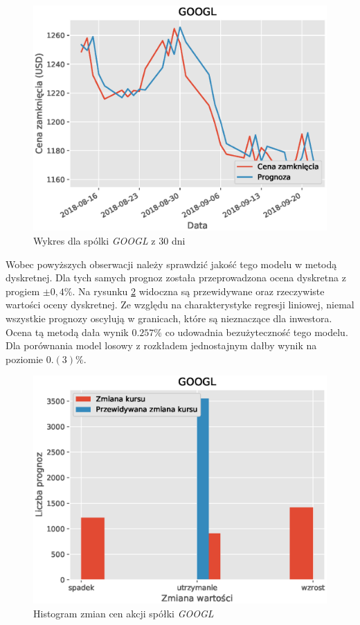 \documentclass[a4paper, twoside, 11pt, openright]{article}
\begin{document}
\begin{figure}[H]
\centering \includegraphics[scale=0.9]{img/linear_regression/l_r_1_day_last_30}
\caption{Wykres dla spólki \textit{GOOGL} z 30 dni}
\label{l_r_1_day_last_30}
\end{figure}


\bigskip

Wobec powyższych obserwacji należy sprawdzić jakość tego modelu w metodą dyskretnej. Dla tych samych prognoz została przeprowadzona ocena dyskretna z progiem $\pm0,4\%$. Na rysunku \ref{l_r_discrete_score} widoczna są przewidywane oraz rzeczywiste wartości oceny dyskretnej. Ze względu na charakterystyke regresji liniowej, niemal wszystkie prognozy oscylują w granicach, które są nieznaczące dla inwestora. Ocena tą metodą dała wynik $0.257\%$ co udowadnia bezużyteczność tego modelu. Dla porównania model losowy z rozkładem jednostajnym dałby wynik na poziomie $0.(3)\%$.


\begin{figure}[H]
\centering \includegraphics[scale=0.9]{img/linear_regression/l_r_discrete_score}
\caption{Histogram zmian cen akcji spółki \textit{GOOGL}}
\label{l_r_discrete_score}
\end{figure}
\end{document}

